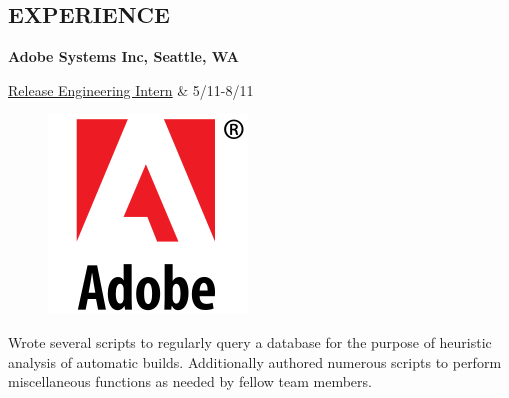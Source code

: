 \documentclass[margin,11pt]{res} %
\begin{document}
\begin{resume}
\section{EXPERIENCE}      {\bf Adobe Systems Inc, Seattle, WA}  \\
                \begin{ncolumn}{2} %
                \underline{Release Engineering Intern}     &      5/11-8/11
                \end{ncolumn}
                
\begin{figure} %
\centering
\hspace{-1in}\includegraphics[scale=0.15]{adobe.png}
\end{figure}                Wrote several scripts to regularly query a database for the purpose of heuristic analysis of automatic builds. Additionally authored numerous scripts to perform miscellaneous functions as needed by fellow team members.
\end{resume} 
\end{document}
